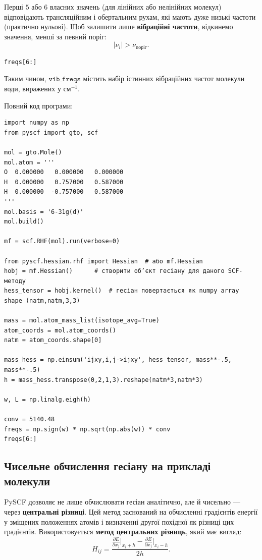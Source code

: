Перші \(5\) або \(6\) власних значень (для лінійних або нелінійних молекул)
відповідають трансляційним і обертальним рухам, які мають
дуже низькі частоти (практично нульові).
Щоб залишити лише \textbf{вібраційні частоти}, відкинемо значення,
менші за певний поріг:
\[
    |\nu_i| > \nu_\text{поріг}.
\]

\begin{verbatim}
freqs[6:]
\end{verbatim}

Таким чином, \(\texttt{vib\_freqs}\) містить набір істинних вібраційних частот
молекули води, виражених у см\(^{-1}\).

Повний код програми:
\begin{verbatim}
import numpy as np
from pyscf import gto, scf

mol = gto.Mole()
mol.atom = '''
O  0.000000   0.000000   0.000000
H  0.000000   0.757000   0.587000
H  0.000000  -0.757000   0.587000
'''
mol.basis = '6-31g(d)'
mol.build()

mf = scf.RHF(mol).run(verbose=0)

from pyscf.hessian.rhf import Hessian  # або mf.Hessian
hobj = mf.Hessian()      # створити об’єкт гесіану для даного SCF-методу
hess_tensor = hobj.kernel()  # гесіан повертається як numpy array shape (natm,natm,3,3)

mass = mol.atom_mass_list(isotope_avg=True)
atom_coords = mol.atom_coords()
natm = atom_coords.shape[0]

mass_hess = np.einsum('ijxy,i,j->ijxy', hess_tensor, mass**-.5, mass**-.5)
h = mass_hess.transpose(0,2,1,3).reshape(natm*3,natm*3)

w, L = np.linalg.eigh(h)

conv = 5140.48
freqs = np.sign(w) * np.sqrt(np.abs(w)) * conv
freqs[6:]
\end{verbatim}


\subsection{Чисельне обчислення гесіану на прикладі молекули }

PySCF дозволяє не лише обчислювати гесіан аналітично, але й чисельно --- через \textbf{центральні різниці}.
Цей метод заснований на обчисленні градієнтів енергії у зміщених положеннях атомів і визначенні другої похідної як різниці цих градієнтів. Використовується \textbf{метод центральних різниць}, який має вигляд:
\begin{equation}\label{eq:H-numerical}
    H_{ij} =
    \frac{\frac{\partial E}{\partial x_j}\big|_{x_i+h} -
          \frac{\partial E}{\partial x_j}\big|_{x_i-h}}{2h}.
\end{equation}


